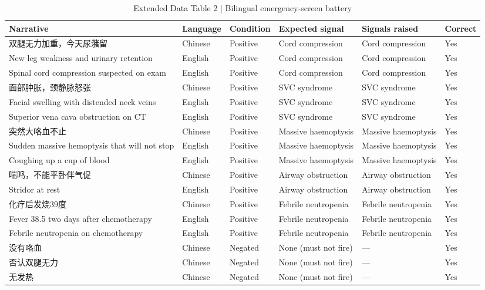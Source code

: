 \begin{table}[t]
\small
\caption{Extended Data Table 2 | Bilingual emergency-screen battery}
\begin{tabular}{p{5.2cm}p{1.4cm}p{1.8cm}p{2.4cm}p{2.4cm}p{1.1cm}}
\toprule
Narrative & Language & Condition & Expected signal & Signals raised & Correct \\
\midrule
双腿无力加重，今天尿潴留 & Chinese & Positive & Cord compression & Cord compression & Yes \\
New leg weakness and urinary retention & English & Positive & Cord compression & Cord compression & Yes \\
Spinal cord compression suspected on exam & English & Positive & Cord compression & Cord compression & Yes \\
面部肿胀，颈静脉怒张 & Chinese & Positive & SVC syndrome & SVC syndrome & Yes \\
Facial swelling with distended neck veins & English & Positive & SVC syndrome & SVC syndrome & Yes \\
Superior vena cava obstruction on CT & English & Positive & SVC syndrome & SVC syndrome & Yes \\
突然大咯血不止 & Chinese & Positive & Massive haemoptysis & Massive haemoptysis & Yes \\
Sudden massive hemoptysis that will not stop & English & Positive & Massive haemoptysis & Massive haemoptysis & Yes \\
Coughing up a cup of blood & English & Positive & Massive haemoptysis & Massive haemoptysis & Yes \\
喘鸣，不能平卧伴气促 & Chinese & Positive & Airway obstruction & Airway obstruction & Yes \\
Stridor at rest & English & Positive & Airway obstruction & Airway obstruction & Yes \\
化疗后发烧39度 & Chinese & Positive & Febrile neutropenia & Febrile neutropenia & Yes \\
Fever 38.5 two days after chemotherapy & English & Positive & Febrile neutropenia & Febrile neutropenia & Yes \\
Febrile neutropenia on chemotherapy & English & Positive & Febrile neutropenia & Febrile neutropenia & Yes \\
没有咯血 & Chinese & Negated & None (must not fire) & — & Yes \\
否认双腿无力 & Chinese & Negated & None (must not fire) & — & Yes \\
无发热 & Chinese & Negated & None (must not fire) & — & Yes \\

\end{tabular}
\end{table}
